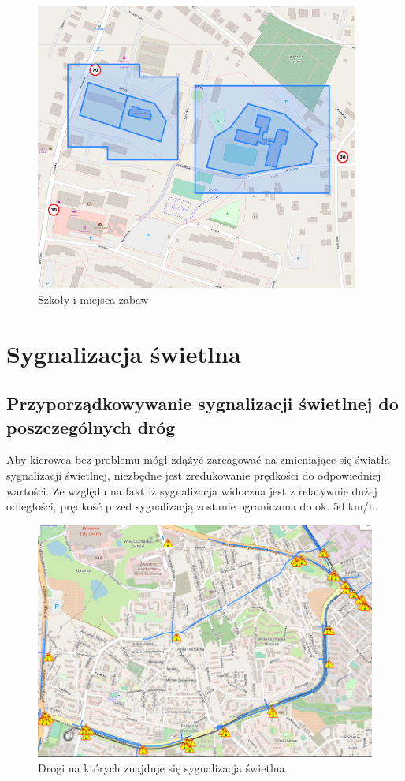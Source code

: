 \begin{figure}[h]
\caption{Szkoły i miejsca zabaw}
\label{sec:schoolsSpeed}
\centering
\includegraphics[width=0.95\textwidth]{schoolsSpeed}
\end{figure}


\newpage
\section{Sygnalizacja świetlna}
\label{sec:trafficSignalMain}
\subsection{Przyporządkowywanie sygnalizacji świetlnej do poszczególnych dróg}

Aby kierowca bez problemu mógł zdążyć zareagować na zmieniające się światła sygnalizacji świetlnej, niezbędne jest zredukowanie prędkości do odpowiedniej wartości. Ze względu na fakt iż sygnalizacja widoczna jest z relatywnie dużej odległości, prędkość przed sygnalizacją zostanie ograniczona do ok. 50 km/h.


\begin{figure}[h]
\caption{Drogi na których znajduje się sygnalizacja świetlna.}
\label{sec:PrzejazdyKolejowe2}
\centering
\includegraphics[width=1.1\textwidth]{traffic_sight}
\end{figure}

